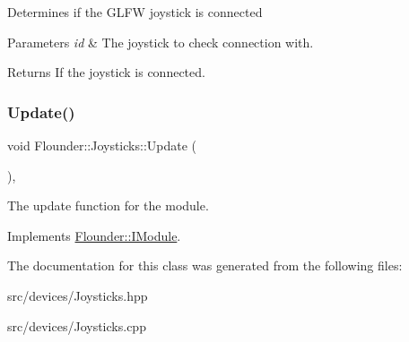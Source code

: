 Determines if the G\+L\+FW joystick is connected 


\begin{DoxyParams}{Parameters}
{\em id} & The joystick to check connection with. \\
\hline
\end{DoxyParams}
\begin{DoxyReturn}{Returns}
If the joystick is connected. 
\end{DoxyReturn}
\mbox{\label{class_flounder_1_1_joysticks_ae36e2d9f8c8736fc6c22dde0e58f2d4d}} 
\subsubsection{\texorpdfstring{Update()}{Update()}}
{\footnotesize\ttfamily void Flounder\+::\+Joysticks\+::\+Update (\begin{DoxyParamCaption}{ }\end{DoxyParamCaption})\hspace{0.3cm}{\ttfamily [override]}, {\ttfamily [virtual]}}



The update function for the module. 



Implements \hyperlink{class_flounder_1_1_i_module_a1812bb03a6990e4698a10c043fa25fde}{Flounder\+::\+I\+Module}.



The documentation for this class was generated from the following files\+:\begin{DoxyCompactItemize}
\item 
src/devices/Joysticks.\+hpp\item 
src/devices/Joysticks.\+cpp\end{DoxyCompactItemize}
